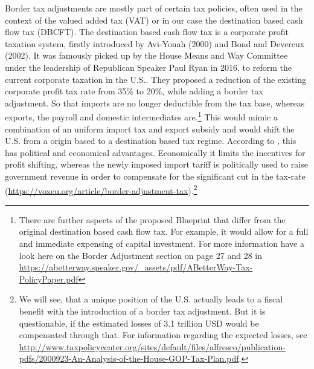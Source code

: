 Border tax adjustments are mostly part of certain tax policies, often used in the context of the valued added tax (VAT) or in our case the destination based cash flow tax (DBCFT). The destination based cash flow tax is a corporate profit taxation system, firstly introduced by Avi-Yonah (2000) and Bond and Devereux (2002).
It was famously picked up by the House Means and Way Committee under the leadership of Republican Speaker Paul Ryan in 2016, to reform the current corporate taxation in the U.S.. They proposed a reduction of the existing corporate profit tax rate from 35\% to 20\%, while adding a border tax adjustment. So that imports are no longer deductible from the tax base, whereas exports, the payroll and domestic intermediates are.\footnote{There are further aspects of the proposed Blueprint that differ from the original destination based cash flow tax. For example, it would allow for a full and immediate expensing of capital investment. For more information have a look here on the Border Adjustment section on page 27 and 28 in \url{https://abetterway.speaker.gov/_assets/pdf/ABetterWay-Tax-PolicyPaper.pdf}} This would mimic a combination of an uniform import tax and export subsidy and would shift the U.S. from a origin based to a destination based tax regime. According to \cite{auerbach2017destination}, this has political and economical advantages. Economically it limits the incentives for profit shifting, whereas the newly imposed import tariff is politically used to raise government revenue in order to compensate for the significant cut in the tax-rate (\url{https://voxeu.org/article/border-adjustment-tax}).\footnote{We will see, that a unique position of the U.S. actually leads to a fiscal benefit with the introduction of a border tax adjustment. But it is questionable, if the estimated losses of 3.1 trillion USD would be compensated through that. For information regarding the expected losses, see \url{http://www.taxpolicycenter.org/sites/default/files/alfresco/publication-pdfs/2000923-An-Analysis-of-the-House-GOP-Tax-Plan.pdf}.} 

